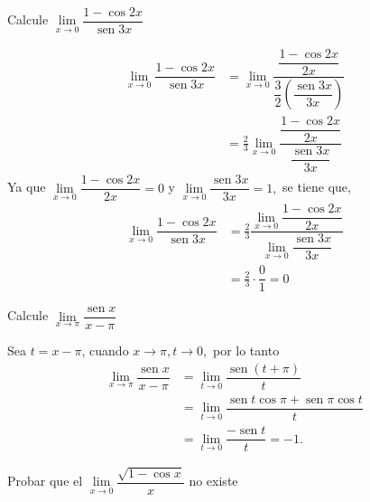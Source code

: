 \begin{example}
Calcule $\lim\limits_{x\rightarrow0}\dfrac{1-\cos2x}{\operatorname{sen}3x}$
\end{example}

\begin{sol}%
\begin{align*}
\lim\limits_{x\rightarrow0}\dfrac{1-\cos2x}{\operatorname{sen}3x}  &
=\lim\limits_{x\rightarrow0}\dfrac{\dfrac{1-\cos2x}{2x}}{\dfrac{3}{2}\left(
\dfrac{\operatorname{sen}3x}{3x}\right)  }\\
&  =\frac{2}{3}\lim\limits_{x\rightarrow0}\dfrac{\dfrac{1-\cos2x}{2x}}%
{\dfrac{\operatorname{sen}3x}{3x}}%
\end{align*}
Ya que $\lim\limits_{x\rightarrow0}\dfrac{1-\cos2x}{2x}=0$ y $\lim
\limits_{x\rightarrow0}\dfrac{\operatorname{sen}3x}{3x}=1,$ se tiene que,%
\begin{align*}
\lim\limits_{x\rightarrow0}\dfrac{1-\cos2x}{\operatorname{sen}3x}  &
=\frac{2}{3}\dfrac{\lim\limits_{x\rightarrow0}\dfrac{1-\cos2x}{2x}}%
{\lim\limits_{x\rightarrow0}\dfrac{\operatorname{sen}3x}{3x}}\\
&  =\frac{2}{3}\cdot\dfrac{0}{1}=0
\end{align*}

\end{sol}

\begin{example}
Calcule $\lim\limits_{x\rightarrow\pi}\dfrac{\operatorname{sen}x}{x-\pi}$
\end{example}

\begin{sol}
Sea $t=x-\pi$, cuando $x\rightarrow\pi,t\rightarrow0,$ por lo tanto%
\begin{align*}
\lim\limits_{x\rightarrow\pi}\dfrac{\operatorname{sen}x}{x-\pi}  &
=\lim\limits_{t\rightarrow0}\dfrac{\operatorname{sen}(t+\pi)}{t}\\
&  =\lim\limits_{t\rightarrow0}\dfrac{\operatorname{sen}t\cos\pi
+\operatorname{sen}\pi\cos t}{t}\\
&  =\lim\limits_{t\rightarrow0}\dfrac{-\operatorname{sen}t}{t}=-1.
\end{align*}

\end{sol}

\begin{example}
Probar que el $\lim\limits_{x\rightarrow0}\dfrac{\sqrt{1-\cos x}}{x}$ no existe
\end{example}

